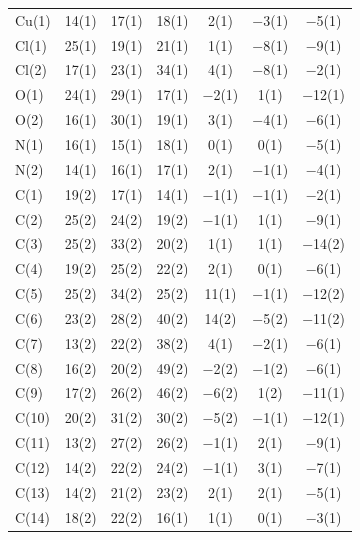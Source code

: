 \onecolumn
\begin{center}
\tablelasttail{\bottomrule}
{\footnotesize \singlespacing
\begin{supertabular}{lcccccc}
Cu(1)&14(1) &17(1)&18(1) &2(1)&$-$3(1) &$-$5(1)\\
Cl(1)&25(1) &19(1)&21(1) &1(1)&$-$8(1) &$-$9(1)\\
Cl(2)&17(1) &23(1)&34(1) &4(1)&$-$8(1) &$-$2(1)\\
O(1)&24(1) &29(1)&17(1) &$-$2(1)&1(1) &$-$12(1)\\
O(2)&16(1) &30(1)&19(1) &3(1)&$-$4(1) &$-$6(1)\\
N(1)&16(1) &15(1)&18(1) &0(1)&0(1) &$-$5(1)\\
N(2)&14(1) &16(1)&17(1) &2(1)&$-$1(1) &$-$4(1)\\
C(1)&19(2) &17(1)&14(1) &$-$1(1)&$-$1(1) &$-$2(1)\\
C(2)&25(2) &24(2)&19(2) &$-$1(1)&1(1) &$-$9(1)\\
C(3)&25(2) &33(2)&20(2) &1(1)&1(1) &$-$14(2)\\
C(4)&19(2) &25(2)&22(2) &2(1)&0(1) &$-$6(1)\\
C(5)&25(2) &34(2)&25(2) &11(1)&$-$1(1) &$-$12(2)\\
C(6)&23(2) &28(2)&40(2) &14(2)&$-$5(2) &$-$11(2)\\
C(7)&13(2) &22(2)&38(2) &4(1)&$-$2(1) &$-$6(1)\\
C(8)&16(2) &20(2)&49(2) &$-$2(2)&$-$1(2) &$-$6(1)\\
C(9)&17(2) &26(2)&46(2) &$-$6(2)&1(2) &$-$11(1)\\
C(10)&20(2) &31(2)&30(2) &$-$5(2)&$-$1(1) &$-$12(1)\\
C(11)&13(2) &27(2)&26(2) &$-$1(1)&2(1) &$-$9(1)\\
C(12)&14(2) &22(2)&24(2) &$-$1(1)&3(1) &$-$7(1)\\
C(13)&14(2) &21(2)&23(2) &2(1)&2(1) &$-$5(1)\\
C(14)&18(2) &22(2)&16(1) &1(1)&0(1) &$-$3(1)\\

\end{supertabular}}
\end{center}

